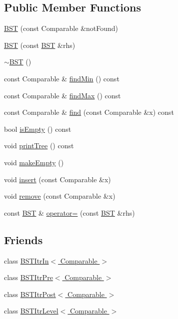 \subsection*{Public Member Functions}
\begin{DoxyCompactItemize}
\item 
\hyperlink{class_b_s_t_a3185a79cf472271f122a97d0f59022d1}{B\-S\-T} (const Comparable \&not\-Found)
\item 
\hyperlink{class_b_s_t_a163232cc6ffcbd1a51707efcc3fa36ca}{B\-S\-T} (const \hyperlink{class_b_s_t}{B\-S\-T} \&rhs)
\item 
\hyperlink{class_b_s_t_abf3125f968641c8726101c5dd18f36be}{$\sim$\-B\-S\-T} ()
\item 
const Comparable \& \hyperlink{class_b_s_t_a34fd17be76f49a77573185f29dede6be}{find\-Min} () const 
\item 
const Comparable \& \hyperlink{class_b_s_t_aee725fe273c0b3641070883b50eee271}{find\-Max} () const 
\item 
const Comparable \& \hyperlink{class_b_s_t_a337dce7f94a881e253635cbf3ac7eacf}{find} (const Comparable \&x) const 
\item 
bool \hyperlink{class_b_s_t_a8018fc7d6c15b2564c10ddcc4316c64d}{is\-Empty} () const 
\item 
void \hyperlink{class_b_s_t_a5270473db9e17e1737b92dd0d6cd0ee5}{print\-Tree} () const 
\item 
void \hyperlink{class_b_s_t_a050d829503a88714c4ad0773cf6d3af6}{make\-Empty} ()
\item 
void \hyperlink{class_b_s_t_a2b117df6521c7d61dac75ff2c938bae7}{insert} (const Comparable \&x)
\item 
void \hyperlink{class_b_s_t_a6f01a0b44daf82a42022b6eb4c0df7a2}{remove} (const Comparable \&x)
\item 
const \hyperlink{class_b_s_t}{B\-S\-T} \& \hyperlink{class_b_s_t_aa80c39f454c89d4a202be3d1445823f3}{operator=} (const \hyperlink{class_b_s_t}{B\-S\-T} \&rhs)
\end{DoxyCompactItemize}
\subsection*{Friends}
\begin{DoxyCompactItemize}
\item 
class \hyperlink{class_b_s_t_aab3993acac2ab24a0b59edb0c3acc775}{B\-S\-T\-Itr\-In$<$ Comparable $>$}
\item 
class \hyperlink{class_b_s_t_a45a55df6f11541416d4ea7684c575c1a}{B\-S\-T\-Itr\-Pre$<$ Comparable $>$}
\item 
class \hyperlink{class_b_s_t_a5dc153694be266f6e772659486219da7}{B\-S\-T\-Itr\-Post$<$ Comparable $>$}
\item 
class \hyperlink{class_b_s_t_a26ff00bc0d87069aed877f10fd3c80a8}{B\-S\-T\-Itr\-Level$<$ Comparable $>$}
\end{DoxyCompactItemize}


